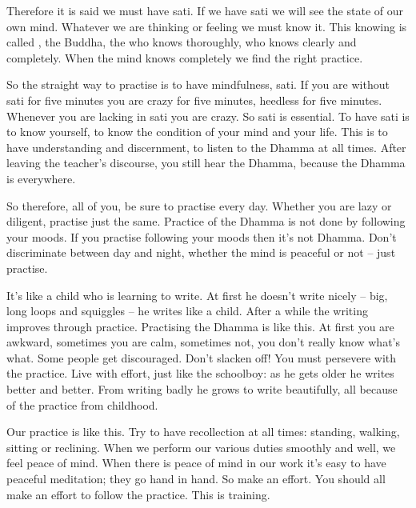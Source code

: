 Therefore it is said we must have sati. If we have sati we will see the state of our own mind. Whatever we are thinking or feeling we must know it. This knowing is called , the Buddha, the  who knows thoroughly, who knows clearly and completely. When the mind knows completely we find the right practice. 

So the straight way to practise is to have mindfulness, sati. If you are without sati for five minutes you are crazy for five minutes, heedless for five minutes. Whenever you are lacking in sati you are crazy. So sati is essential. To have sati is to know yourself, to know the condition of your mind and your life. This is to have understanding and discernment, to listen to the Dhamma at all times. After leaving the teacher's discourse, you still hear the Dhamma, because the Dhamma is everywhere. 

So therefore, all of you, be sure to practise every day. Whether you are lazy or diligent, practise just the same. Practice of the Dhamma is not done by following your moods. If you practise following your moods then it's not Dhamma. Don't discriminate between day and night, whether the mind is peaceful or not -- just practise. 

It's like a child who is learning to write. At first he doesn't write nicely -- big, long loops and squiggles -- he writes like a child. After a while the writing improves through practice. Practising the Dhamma is like this. At first you are awkward, sometimes you are calm, sometimes not, you don't really know what's what. Some people get discouraged. Don't slacken off! You must persevere with the practice. Live with effort, just like the schoolboy: as he gets older he writes better and better. From writing badly he grows to write beautifully, all because of the practice from childhood. 

Our practice is like this. Try to have recollection at all times: standing, walking, sitting or reclining. When we perform our various duties smoothly and well, we feel peace of mind. When there is peace of mind in our work it's easy to have peaceful meditation; they go hand in hand. So make an effort. You should all make an effort to follow the practice. This is training. 

